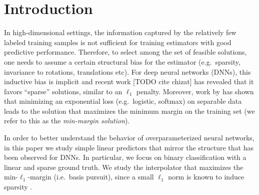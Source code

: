 \section{Introduction}

In high-dimensional settings, the information captured by the relatively few
labeled training samples is not sufficient for training estimators with good
predictive performance. Therefore, to select among the set of feasible
solutions, one needs to assume a certain structural bias for the estimator
(e.g.\ sparsity, invariance to rotations, translations etc).
For deep neural networks (DNNs), this inductive bias is implicit and recent work [TODO
cite chizat] has revealed that it favors ``sparse'' solutions, similar to an
$\ell_1$ penalty. Moreover, work by \citet{soudry18,Ji20} has shown that
minimizing an exponential loss (e.g.\ logistic, softmax) on separable data leads
to the solution that maximizes the minimum margin on the training set (we refer
to this as the \emph{min-margin solution}).

In order to better understand the behavior of overparameterized neural networks,
in this paper we study simple linear predictors that mirror the structure that
has been observed for DNNs. In particular, we focus on binary classification
with a linear and sparse ground truth. We study the interpolator that maximizes
the min-$\ell_1$-margin (i.e.\ basis pursuit), since a small $\ell_1$ norm is
known to induce sparsity \citep{tibshirani96}.

